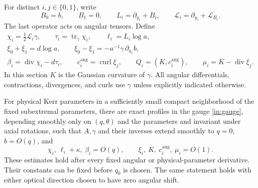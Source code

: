 For distinct $i,j\in\{0,1\}$, write
\[
 B_0=b,\qquad B_1=0,\qquad
 L_i=\partial_{y_i}+B_i,\qquad
 \mathscr L_i=\partial_{y_i}+\mathcal L_{B_i}.
\]
The last operator acts on angular tensors. Define
\begin{equation}\label{in:variables}
\begin{gathered}
 \chi_i=\tfrac12\mathscr L_i\gamma,\qquad
 \tau_i=\operatorname{tr}_\gamma\chi_i,\qquad
 \ell_i=L_i\log a,\\
 \xi_0+\xi_1=d\log a,\qquad
 \xi_0-\xi_1=-a^{-1}\gamma\,\partial_{y_1}b,\\
 \beta_i=\operatorname{div}\chi_i-d\tau_i,\qquad
 c_i^{\mathrm{ang}}=\operatorname{curl}\xi_j,\qquad
 Q_i=(K,c_i^{\mathrm{ang}}),\qquad
 \mu_i=K-\operatorname{div}\xi_j.
\end{gathered}
\end{equation}
In this section $K$ is the Gaussian curvature of $\gamma$.
All angular differentials, contractions, divergences, and curls use
$\gamma$ unless explicitly indicated otherwise.

\begin{lemma}\label{in:profiles}
For physical Kerr parameters in a sufficiently small compact
neighborhood of the fixed subextremal parameters, there are exact
profiles in the gauge \eqref{in:gauge}, depending smoothly only on
$(q,\theta)$ and the parameters and invariant under axial rotations,
such that $A,\gamma$ and their inverses extend smoothly to $q=0$,
$b=O(q)$, and
\begin{equation}\label{in:profile-orders}
 \chi_i,\ \ell_i+\kappa,\ \beta_i=O(q),\qquad
 \xi_i,\ K,\ c_i^{\mathrm{ang}},\ \mu_i=O(1).
\end{equation}
These estimates hold after every fixed angular or physical-parameter
derivative. Their constants can be fixed before $q_0$ is chosen.
The same statement holds with either optical direction chosen to have
zero angular shift.
\end{lemma}

